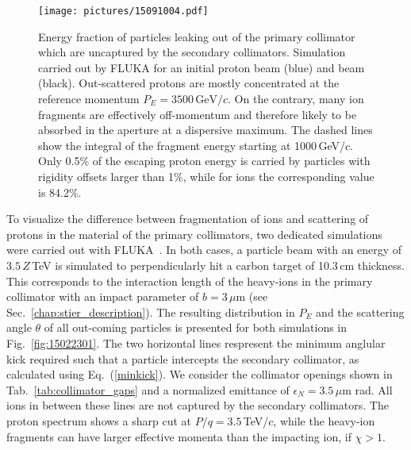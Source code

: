 \begin{figure}[b]
  \begin{center}
\texttt{[image: pictures/15091004.pdf]}
\caption{Energy fraction of particles leaking out of the primary collimator which are uncaptured by the secondary collimators. Simulation carried out by FLUKA for an initial proton beam (blue) and \lead beam (black). Out-scattered protons are mostly concentrated at the reference momentum $P_E=3500\,\text{GeV}/c$. On the contrary, many ion fragments are effectively off-momentum and therefore likely to be absorbed in the aperture at a dispersive maximum. The dashed lines show the integral of the fragment energy starting at 1000$\,$GeV/$c$. Only 0.5\% of the escaping proton energy is carried by particles with rigidity offsets larger than 1\%, while for ions the corresponding value is 84.2\%. }
\label{fig:15062510.pdf}
  \end{center}
\end{figure}
 



To visualize the difference between fragmentation of  \lead ions and scattering of protons in the material of the primary collimators, two dedicated simulations were carried out with FLUKA~\cite{bohlen2014fluka,ferrari2005fluka}. In both cases, a particle beam with an energy of $3.5\,Z\,$TeV is simulated to perpendicularly hit a carbon target of 10.3$\,$cm thickness. This corresponds to the interaction length of the heavy-ions in the primary collimator with an impact parameter of $b=3\,\mu$m (see Sec.~\ref{chap:stier_description}). The resulting distribution in $P_E$ and the scattering angle $\theta$ of all out-coming particles is presented for both simulations in Fig.~\ref{fig:15022301}. The two horizontal lines respresent the minimum anglular kick required such that a particle intercepts the secondary collimator, as calculated using Eq.~(\ref{minkick}). We consider the collimator openings shown in Tab.~\ref{tab:collimator_gaps} and a normalized emittance of $\epsilon_N=3.5\,\mu$m rad. All ions in between these lines are not captured by the secondary collimators. The proton spectrum shows a sharp cut at $P/q=3.5\,$TeV/$c$, while the heavy-ion fragments can have larger effective momenta than the impacting ion, if $\chi>1$. 



